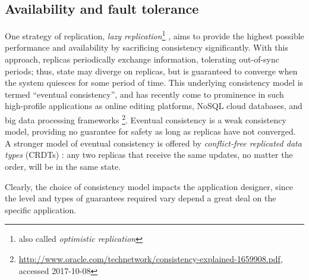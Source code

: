 \subsection{Availability and fault tolerance}
\label{sub:background_replication}


One strategy of replication, \textit{lazy replication}\footnote{also called \textit{optimistic replication}} \cite{Ladin:1990,Ladin:1992}, aims to provide the highest possible performance and availability by sacrificing consistency significantly.
With this approach, replicas periodically exchange information, tolerating out-of-sync periods; thus, state may diverge on replicas, but is guaranteed to converge when the system quiesces for some period of time.
This underlying consistency model is termed ``eventual consistency'', and has recently come to prominence in such high-profile applications as online editing platforms, NoSQL cloud databases, and big data processing frameworks \footnote{\url{http://www.oracle.com/technetwork/consistency-explained-1659908.pdf}, accessed 2017-10-08}.
Eventual consistency is a weak consistency model, providing no guarantee for safety as long as replicas have not converged.
A stronger model of eventual consistency is offered by \textit{conflict-free replicated data types} (CRDTs) \cite{Shapiro:2011}: any two replicas that receive the same updates, no matter the order, will be in the same state.

Clearly, the choice of consistency model impacts the application designer, since the level and types of guarantees required vary depend a great deal on the specific application.
